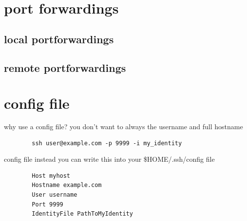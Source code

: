 \documentclass[10pt,graphics,aspectratio=169,table]{beamer}
\begin{document}
\section{port forwardings}
\subsection{local portforwardings}
\subsection{remote portforwardings}
\section{config file}
\begin{frame}[fragile]{why use a config file?}
    you don't want to always the username and full hostname
    \begin{lstlisting}
        ssh user@example.com -p 9999 -i my_identity
    \end{lstlisting}
\end{frame}

\begin{frame}[fragile]{config file}
    instead you can write this into your \$HOME/.ssh/config file 
    \begin{lstlisting}
        Host myhost
        Hostname example.com
        User username
        Port 9999
        IdentityFile PathToMyIdentity
    \end{lstlisting}
\end{frame}
\end{document}
